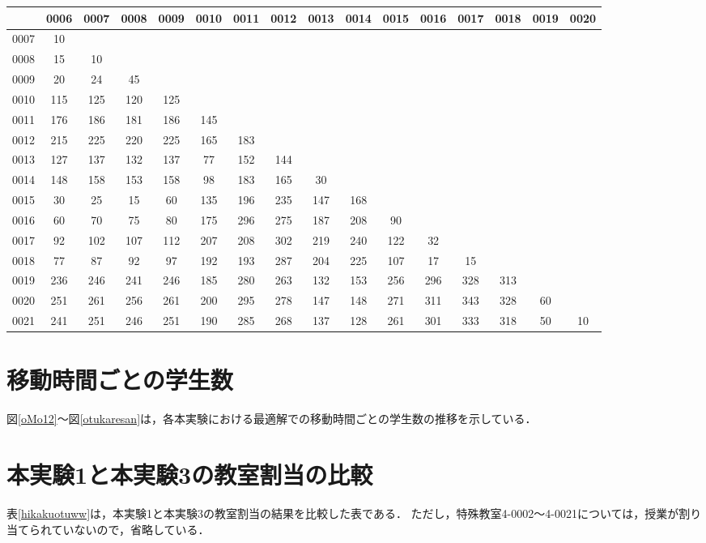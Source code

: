 \begin{table}[htbp]
 \begin{center}
  {\tiny
  \begin{tabular}{lccccccccccccccc}
%
\hline
 & 0006 & 0007 & 0008 & 0009 & 0010 & 0011 & 0012 & 0013 & 0014 & 0015 &
   0016 & 0017 & 0018 & 0019 & 0020 \\
\hline
0007 & 10 &  &  &  &  &  &  &  &  &  &  &  &  &  &  \\
0008 & 15 & 10 &  &  &  &  &  &  &  &  &  &  &  &  &  \\
0009 & 20 & 24 & 45 &  &  &  &  &  &  &  &  &  &  &  &  \\
0010 & 115 & 125 & 120 & 125 &  &  &  &  &  &  &  &  &  &  &  \\
0011 & 176 & 186 & 181 & 186 & 145 &  &  &  &  &  &  &  &  &  &  \\
0012 & 215 & 225 & 220 & 225 & 165 & 183 &  &  &  &  &  &  &  &  &  \\
0013 & 127 & 137 & 132 & 137 & 77 & 152 & 144 &  &  &  &  &  &  &  &  \\
0014 & 148 & 158 & 153 & 158 & 98 & 183 & 165 & 30 &  &  &  &  &  &  &  \\
0015 & 30 & 25 & 15 & 60 & 135 & 196 & 235 & 147 & 168 &  &  &  &  &  &  \\
0016 & 60 & 70 & 75 & 80 & 175 & 296 & 275 & 187 & 208 & 90 &  &  &  &
							   &  \\
0017 & 92 & 102 & 107 & 112 & 207 & 208 & 302 & 219 & 240 & 122 & 32 &
						   &  &  &  \\
0018 & 77 & 87 & 92 & 97 & 192 & 193 & 287 & 204 & 225 & 107 & 17 & 15 &
						       &  &  \\
0019 & 236 & 246 & 241 & 246 & 185 & 280 & 263 & 132 & 153 & 256 & 296 &
						   328 & 313 &  &  \\
0020 & 251 & 261 & 256 & 261 & 200 & 295 & 278 & 147 & 148 & 271 & 311 &
						   343 & 328 & 60 &  \\
0021 & 241 & 251 & 246 & 251 & 190 & 285 & 268 & 137 & 128 & 261 & 301 &
						   333 & 318 & 50 & 10 \\
\hline
%
  \end{tabular}
  }
 \end{center}
\end{table}

\newpage
\section{移動時間ごとの学生数}
図\ref{oMo12}～図\ref{otukaresan}は，各本実験における最適解での移動時間ごとの学生数の推移を示している．




\newpage
\section{本実験1と本実験3の教室割当の比較}
表\ref{hikakuotuww}は，本実験1と本実験3の教室割当の結果を比較した表である．
ただし，特殊教室4-0002～4-0021については，授業が割り当てられていないので，省略している． 


